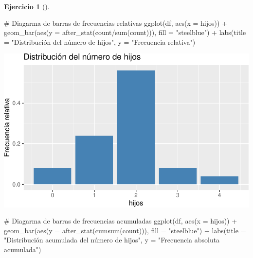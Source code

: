 \documentclass[
  a4paper,
]{scrreport}
\newenvironment{Shaded}{\begin{snugshade}}{\end{snugshade}}
\newcommand{\AttributeTok}[1]{\textcolor[rgb]{0.40,0.45,0.13}{#1}}
\newcommand{\CommentTok}[1]{\textcolor[rgb]{0.37,0.37,0.37}{#1}}
\newcommand{\FunctionTok}[1]{\textcolor[rgb]{0.28,0.35,0.67}{#1}}
\newcommand{\NormalTok}[1]{\textcolor[rgb]{0.00,0.23,0.31}{#1}}
\newcommand{\SpecialCharTok}[1]{\textcolor[rgb]{0.37,0.37,0.37}{#1}}
\newcommand{\StringTok}[1]{\textcolor[rgb]{0.13,0.47,0.30}{#1}}
\theoremstyle{definition}
\newtheorem{exercise}{Ejercicio}[chapter]
\theoremstyle{remark}
\begin{document}
\begin{exercise}[]
\begin{enumerate}
\begin{tcolorbox}
\begin{Shaded}
\begin{Highlighting}[]
\CommentTok{\# Diagarma de barras de frecuencias relativas}
\FunctionTok{ggplot}\NormalTok{(df, }\FunctionTok{aes}\NormalTok{(}\AttributeTok{x =}\NormalTok{ hijos)) }\SpecialCharTok{+}
    \FunctionTok{geom\_bar}\NormalTok{(}\FunctionTok{aes}\NormalTok{(}\AttributeTok{y =} \FunctionTok{after\_stat}\NormalTok{(count}\SpecialCharTok{/}\FunctionTok{sum}\NormalTok{(count))), }\AttributeTok{fill =} \StringTok{"steelblue"}\NormalTok{) }\SpecialCharTok{+}
    \FunctionTok{labs}\NormalTok{(}\AttributeTok{title =} \StringTok{"Distribución del número de hijos"}\NormalTok{, }\AttributeTok{y =} \StringTok{"Frecuencia relativa"}\NormalTok{)}
\end{Highlighting}
\end{Shaded}

  \includegraphics{03-frecuencias-graficos_files/figure-pdf/unnamed-chunk-7-2.pdf}

\begin{Shaded}
\begin{Highlighting}[]
\CommentTok{\# Diagarma de barras de frecuencias acumuladas}
\FunctionTok{ggplot}\NormalTok{(df, }\FunctionTok{aes}\NormalTok{(}\AttributeTok{x =}\NormalTok{ hijos)) }\SpecialCharTok{+}
    \FunctionTok{geom\_bar}\NormalTok{(}\FunctionTok{aes}\NormalTok{(}\AttributeTok{y =} \FunctionTok{after\_stat}\NormalTok{(}\FunctionTok{cumsum}\NormalTok{(count))), }\AttributeTok{fill =} \StringTok{"steelblue"}\NormalTok{) }\SpecialCharTok{+}
    \FunctionTok{labs}\NormalTok{(}\AttributeTok{title =} \StringTok{"Distribución acumulada del número de hijos"}\NormalTok{, }\AttributeTok{y =} \StringTok{"Frecuencia absoluta acumulada"}\NormalTok{)}
\end{Highlighting}
\end{Shaded}


\end{tcolorbox}
\end{enumerate}
\end{exercise}
\end{document}
